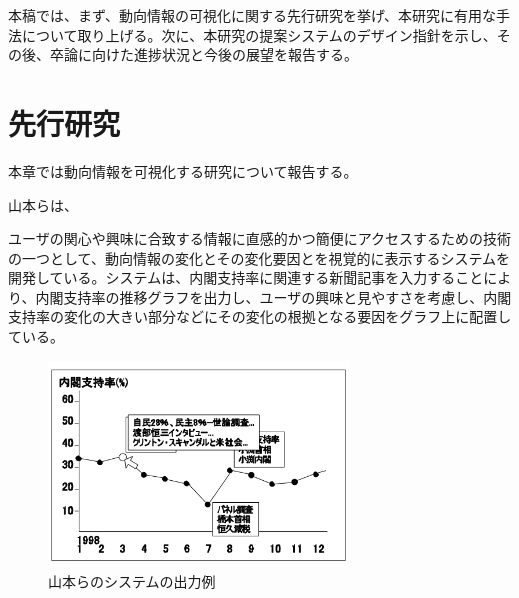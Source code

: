 \documentclass{matsushita-zemi}
\begin{document}

本稿では、まず、動向情報の可視化に関する先行研究を挙げ、本研究に有用な手法について取り上げる。次に、本研究の提案システムのデザイン指針を示し、その後、卒論に向けた進捗状況と今後の展望を報告する。

\section{先行研究}
\label{relatedworks} 
本章では動向情報を可視化する研究について報告する。

山本らは、

ユーザの関心や興味に合致する情報に直感的かつ簡便にアクセスするための技術の一つとして、動向情報の変化とその変化要因とを視覚的に表示するシステムを開発している\cite{Tagged_corpus}。システムは、内閣支持率に関連する新聞記事を入力することにより、内閣支持率の推移グラフを出力し、ユーザの興味と見やすさを考慮し、内閣支持率の変化の大きい部分などにその変化の根拠となる要因をグラフ上に配置している。
\begin{figure}[tb]
  \begin{center}
   \includegraphics[width=8cm,bb=0 0 521 356]{tagu.PNG}
  \end{center}
 \caption{山本らのシステムの出力例}
 \label{system}
\end{figure}
\end{document}
